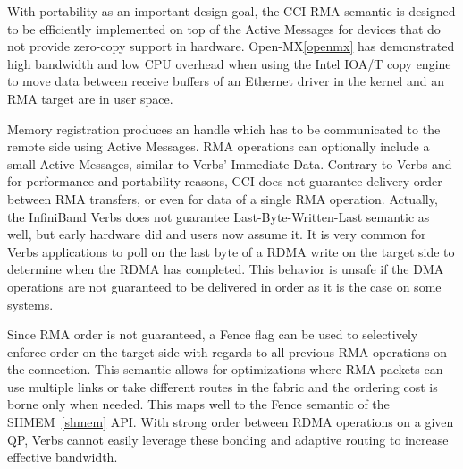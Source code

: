 With portability as an important design goal, the CCI RMA semantic is 
designed to be efficiently implemented on top of the Active Messages 
for devices that do not provide zero-copy support in hardware. 
Open-MX\ref{openmx} has demonstrated high bandwidth and low CPU 
overhead when using the Intel IOA/T copy engine to move data between receive 
buffers of an Ethernet driver in the kernel and an RMA target are in user 
space.

Memory registration produces an handle which has to be communicated to the 
remote side using Active Messages. RMA operations can optionally include a 
small Active Messages, similar to Verbs' Immediate Data. Contrary to Verbs 
and for performance and portability reasons, CCI does not guarantee delivery 
order between RMA transfers, or even for data of a single RMA operation. 
Actually, the InfiniBand Verbs does not guarantee Last-Byte-Written-Last 
semantic as well, but early hardware did and users now assume it. It is 
very common for Verbs applications to poll on the last byte of a RDMA write 
on the target side to determine when the RDMA has completed. This behavior is 
unsafe if the DMA operations are not guaranteed to be delivered in order as 
it is the case on some systems.

Since RMA order is not guaranteed, a Fence flag can be used to selectively 
enforce order on the target side with regards to all previous RMA operations 
on the connection. This semantic allows for optimizations where RMA packets 
can use multiple links or take different routes in the fabric and the ordering 
cost is borne only when needed. This maps well to the Fence semantic of the 
SHMEM~\ref{shmem} API. With strong order between RDMA operations on a given QP, 
Verbs cannot easily leverage these bonding and adaptive routing to increase 
effective bandwidth.
